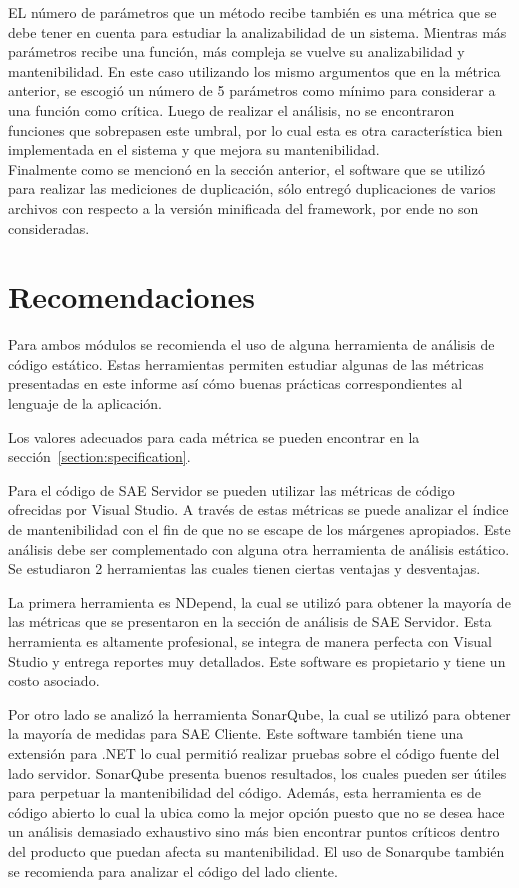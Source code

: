 EL número de parámetros que un método recibe también es una métrica que se debe 
tener en cuenta para estudiar la analizabilidad de un sistema. Mientras más 
parámetros recibe una función, más compleja se vuelve su analizabilidad y 
mantenibilidad. En este caso utilizando los mismo argumentos que en la métrica 
anterior, se escogió un número de 5 parámetros como mínimo para considerar a 
una función como crítica. Luego de realizar el análisis, no se encontraron 
funciones que sobrepasen este umbral, por lo cual esta es otra característica 
bien implementada en el sistema y que mejora su mantenibilidad.
\\

Finalmente como se mencionó en la sección anterior, el software que se utilizó 
para realizar las mediciones de duplicación, sólo entregó duplicaciones de 
varios archivos con respecto a la versión minificada del framework, por ende 
no son consideradas.

\section{Recomendaciones}

Para ambos módulos se recomienda el uso de alguna herramienta de análisis 
de código estático. Estas herramientas permiten estudiar algunas de las métricas 
presentadas en este informe así cómo buenas prácticas correspondientes al 
lenguaje de la aplicación.

Los valores adecuados para cada métrica se pueden encontrar en la 
sección~\ref{section:specification}. 

Para el código de SAE Servidor se pueden utilizar las métricas de código 
ofrecidas por Visual Studio. A través de estas métricas se puede analizar el 
índice de mantenibilidad con el fin de que no se escape de los márgenes 
apropiados. Este análisis debe ser complementado con alguna otra herramienta 
de análisis estático. Se estudiaron 2 herramientas las cuales tienen ciertas 
ventajas y desventajas. 

La primera herramienta es NDepend, la cual se utilizó para obtener la mayoría 
de las métricas que se presentaron en la sección de análisis de SAE Servidor. 
Esta herramienta es altamente profesional, se integra de manera perfecta con 
Visual Studio y entrega reportes muy detallados. Este software es propietario 
y tiene un costo asociado.

Por otro lado se analizó la herramienta SonarQube, la cual se utilizó para 
obtener la mayoría de medidas para SAE Cliente. Este software también tiene 
una extensión para .NET lo cual permitió realizar pruebas sobre el código 
fuente del lado servidor.
SonarQube presenta buenos resultados, los cuales pueden ser útiles para 
perpetuar la mantenibilidad del código. Además, esta herramienta es de código 
abierto lo cual la ubica como la mejor opción puesto que no se desea hace un 
análisis demasiado exhaustivo sino más bien encontrar puntos críticos dentro 
del producto que puedan afecta su mantenibilidad. El uso de Sonarqube también 
se recomienda para analizar el código del lado cliente.



